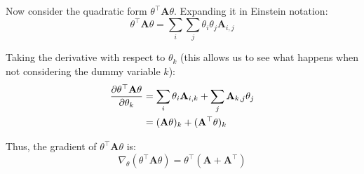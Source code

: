 {
    Now consider the quadratic form \( \theta^\top \mathbf{A} \theta \). Expanding it in Einstein notation:
    \[
        \theta^\top \mathbf{A} \theta = \sum_i \sum_j \theta_i \theta_j \mathbf{A}_{i,j}
    \]

    Taking the derivative with respect to \( \theta_k \) (this allows us to see what happens when not considering the dummy variable \( k \)):
    \begin{align*}
        \frac{\partial \theta^\top \mathbf{A} \theta}{\partial \theta_k} & = \sum_i \theta_i \mathbf{A}_{i,k} + \sum_j \mathbf{A}_{k,j} \theta_j \\
                                                                         & = (\mathbf{A} \theta )_k + (\mathbf{A}^\top \theta)_k
    \end{align*}


    Thus, the gradient of \( \theta^\top \mathbf{A} \theta \) is:
    \[
        \nabla_\theta (\theta^\top \mathbf{A} \theta) = \theta^\top (\mathbf{A} + \mathbf{A}^\top)
    \]

}
